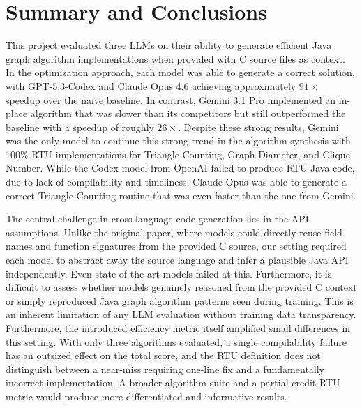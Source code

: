 


\section{Summary and Conclusions}
\label{sec:conclusions}

This project evaluated three LLMs on their ability to generate efficient Java graph algorithm implementations when provided with C source files as context. In the optimization approach, each model was able to generate a correct solution, with GPT-5.3-Codex and Claude Opus 4.6 achieving approximately $91\times$ speedup over the naive baseline. In contrast, Gemini 3.1 Pro implemented an in-place algorithm that was slower than its competitors but still outperformed the baseline with a speedup of roughly $26\times$. Despite these strong results, Gemini was the only model to continue this strong trend in the algorithm synthesis with 100\% RTU implementations for Triangle Counting, Graph Diameter, and Clique Number. While the Codex model from OpenAI failed to produce RTU Java code, due to lack of compilability and timeliness, Claude Opus was able to generate a correct Triangle Counting routine that was even faster than the one from Gemini. 

The central challenge in cross-language code generation lies in the API assumptions. Unlike the original paper, where models could directly reuse field names and function signatures from the provided C source, our setting required each model to abstract away the source language and infer a plausible Java API independently. Even state-of-the-art models failed at this. Furthermore, it is difficult to assess whether models genuinely reasoned from the provided C context or simply reproduced Java graph algorithm patterns seen during training. This is an inherent limitation of any LLM evaluation without training data transparency. Furthermore, the introduced efficiency metric itself amplified small differences in this setting. With only three algorithms evaluated, a single compilability failure has an outsized effect on the total score, and the RTU definition does not distinguish between a near-miss requiring one-line fix and a fundamentally incorrect implementation. A broader algorithm suite and a partial-credit RTU metric would produce more differentiated and informative results.

